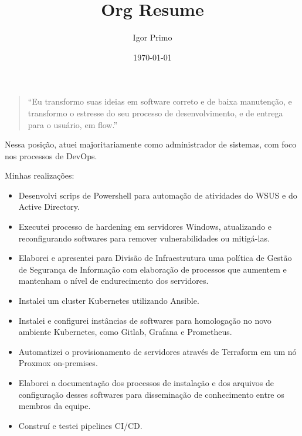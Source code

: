 \documentclass[10pt,a4paper,ragged2e,withhyper]{altacv}
\author{Igor Primo}
\date{\today}
\title{Org Resume}
\begin{document}
\makecvheader
\begin{paracol}{2}
\begin{quote}
 ``Eu transformo suas ideias em software correto e de baixa manutenção, e transformo o estresse do seu processo de desenvolvimento, e de entrega para o usuário, em flow.''
\end{quote}
\label{sec:org5ca2fea}

Nessa posição, atuei majoritariamente como administrador de sistemas, com foco nos processos de DevOps.

Minhas realizações:
\begin{itemize}
\item Desenvolvi scrips de Powershell para automação de atividades do WSUS e do Active Directory.
\item Executei processo de hardening em servidores Windows, atualizando e reconfigurando softwares para remover vulnerabilidades ou mitigá-las.
\item Elaborei e apresentei para Divisão de Infraestrutura uma política de Gestão de Segurança de Informação com elaboração de processos que aumentem e mantenham o nível de endurecimento dos servidores.
\item Instalei um cluster Kubernetes utilizando Ansible.
\item Instalei e configurei instâncias de softwares para homologação no novo ambiente Kubernetes, como Gitlab, Grafana e Prometheus.
\item Automatizei o provisionamento de servidores através de Terraform em um nó Proxmox on-premises.
\item Elaborei a documentação dos processos de instalação e dos arquivos de configuração desses softwares para disseminação de conhecimento entre os membros da equipe.
\item Construí e testei pipelines CI/CD.
\end{itemize}



\end{paracol}
\end{document}
